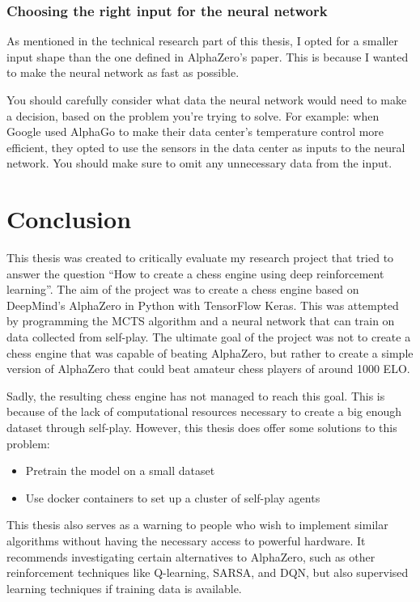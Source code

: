 \documentclass{article}
\begin{document}
\subsubsection{Choosing the right input for the neural network}

As mentioned in the technical research part of this thesis, I opted for a smaller input
shape than the one defined in AlphaZero's paper. This is because I wanted to make the 
neural network as fast as possible. 

You should carefully consider what data the neural network would need to make a decision, 
based on the problem you're trying to solve. For example: when Google used AlphaGo to make
their data center's temperature control more efficient, they opted to use the sensors in the
data center as inputs to the neural network. 
You should make sure to omit any unnecessary data from the input.

\newpage
\section{Conclusion}

This thesis was created to critically evaluate my research project that tried to 
answer the question ``How to create a chess engine using deep reinforcement learning''.
The aim of the project was to create a chess engine based on DeepMind's AlphaZero in
Python with TensorFlow Keras. This was attempted by programming the MCTS algorithm 
and a neural network that can train on data collected from self-play. 
The ultimate goal of the project was not to create a chess engine that was capable of 
beating AlphaZero, but rather to create a simple version of AlphaZero that could 
beat amateur chess players of around 1000 ELO. 

Sadly, the resulting chess engine has not managed to reach this goal.
This is because of the lack of computational resources necessary to create a big enough
dataset through self-play. However, this thesis does offer some solutions to this problem:

\begin{itemize}
    \item Pretrain the model on a small dataset
    \item Use docker containers to set up a cluster of self-play agents
\end{itemize}

This thesis also serves as a warning to people who wish to implement similar algorithms
without having the necessary access to powerful hardware. It recommends investigating certain 
alternatives to AlphaZero, such as other reinforcement techniques like Q-learning, SARSA, and DQN,
but also supervised learning techniques if training data is available.
\end{document}
